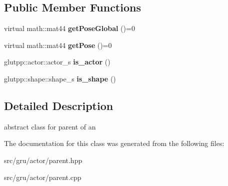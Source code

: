 \subsection*{\-Public \-Member \-Functions}
\begin{DoxyCompactItemize}
\item 
\hypertarget{classglutpp_1_1actor_1_1parent_a8dc2485db2dd2d3d3b1dfa53e22c3dce}{virtual math\-::mat44 {\bfseries get\-Pose\-Global} ()=0}\label{classglutpp_1_1actor_1_1parent_a8dc2485db2dd2d3d3b1dfa53e22c3dce}

\item 
\hypertarget{classglutpp_1_1actor_1_1parent_aa7bd045f2b9e21eddb006998df78a39a}{virtual math\-::mat44 {\bfseries get\-Pose} ()=0}\label{classglutpp_1_1actor_1_1parent_aa7bd045f2b9e21eddb006998df78a39a}

\item 
\hypertarget{classglutpp_1_1actor_1_1parent_a8c58553ae09f5ef4e23145574ecc6a7b}{glutpp\-::actor\-::actor\-\_\-s {\bfseries is\-\_\-actor} ()}\label{classglutpp_1_1actor_1_1parent_a8c58553ae09f5ef4e23145574ecc6a7b}

\item 
\hypertarget{classglutpp_1_1actor_1_1parent_a6275ce6cf8f27d6cd17a3a8a11e6d9b2}{glutpp\-::shape\-::shape\-\_\-s {\bfseries is\-\_\-shape} ()}\label{classglutpp_1_1actor_1_1parent_a6275ce6cf8f27d6cd17a3a8a11e6d9b2}

\end{DoxyCompactItemize}


\subsection{\-Detailed \-Description}
abstract class for parent of an  

\-The documentation for this class was generated from the following files\-:\begin{DoxyCompactItemize}
\item 
src/gru/actor/parent.\-hpp\item 
src/gru/actor/parent.\-cpp\end{DoxyCompactItemize}
